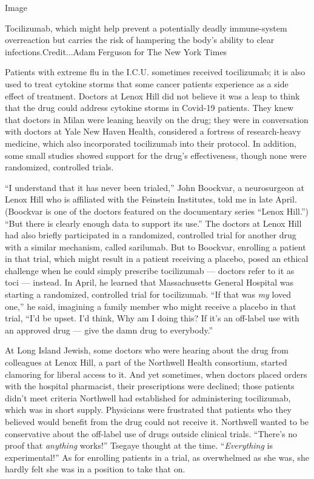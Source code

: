 Image

Tocilizumab, which might help prevent a potentially deadly immune-system
overreaction but carries the risk of hampering the body's ability to
clear infections.Credit...Adam Ferguson for The New York Times

Patients with extreme flu in the I.C.U. sometimes received tocilizumab;
it is also used to treat cytokine storms that some cancer patients
experience as a side effect of treatment. Doctors at Lenox Hill did not
believe it was a leap to think that the drug could address cytokine
storms in Covid-19 patients. They knew that doctors in Milan were
leaning heavily on the drug; they were in conversation with doctors at
Yale New Haven Health, considered a fortress of research-heavy medicine,
which also incorporated tocilizumab into their protocol. In addition,
some small studies showed support for the drug's effectiveness, though
none were randomized, controlled trials.

``I understand that it has never been trialed,'' John Boockvar, a
neurosurgeon at Lenox Hill who is affiliated with the Feinstein
Institutes, told me in late April. (Boockvar is one of the doctors
featured on the documentary series ``Lenox Hill.'') ``But there is
clearly enough data to support its use.'' The doctors at Lenox Hill had
also briefly participated in a randomized, controlled trial for another
drug with a similar mechanism, called sarilumab. But to Boockvar,
enrolling a patient in that trial, which might result in a patient
receiving a placebo, posed an ethical challenge when he could simply
prescribe tocilizumab --- doctors refer to it as toci --- instead. In
April, he learned that Massachusetts General Hospital was starting a
randomized, controlled trial for tocilizumab. ``If that was \emph{my}
loved one,'' he said, imagining a family member who might receive a
placebo in that trial, ``I'd be upset. I'd think, Why am I doing this?
If it's an off-label use with an approved drug --- give the damn drug to
everybody.''

At Long Island Jewish, some doctors who were hearing about the drug from
colleagues at Lenox Hill, a part of the Northwell Health consortium,
started clamoring for liberal access to it. And yet sometimes, when
doctors placed orders with the hospital pharmacist, their prescriptions
were declined; those patients didn't meet criteria Northwell had
established for administering tocilizumab, which was in short supply.
Physicians were frustrated that patients who they believed would benefit
from the drug could not receive it. Northwell wanted to be conservative
about the off-label use of drugs outside clinical trials. ``There's no
proof that \emph{anything} works!'' Tsegaye thought at the time.
``\emph{Everything} is experimental!'' As for enrolling patients in a
trial, as overwhelmed as she was, she hardly felt she was in a position
to take that on.

